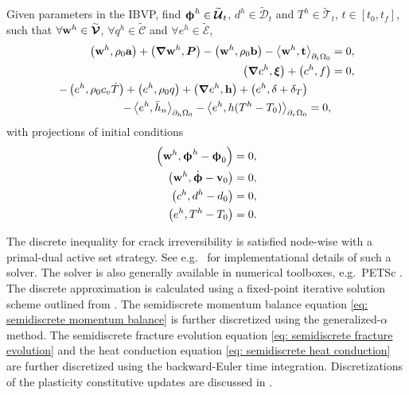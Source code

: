 \begin{mdframed}[
    frametitle={The semidiscrete Galerkin form},
    frametitlebackgroundcolor=gray!20,
    backgroundcolor=gray!5,
    linewidth=0pt,
    nobreak=true
  ]
  Given parameters in the IBVP, find $\boldsymbol{\upphi}^h \in \widetilde{\boldsymbol{\mathcal{U}}}_t$, $d^h \in \widetilde{\mathcal{D}}_t$ and $T^h \in \widetilde{\mathcal{T}}_t$, $t \in [t_0, t_f]$, such that $\forall \textbf{w}^h \in \widetilde{\boldsymbol{\mathcal{V}}}$, $\forall q^h \in \widetilde{\mathcal{C}}$ and $\forall e^h \in \widetilde{\mathcal{E}}$,
  \begin{subequations}
    \begin{align}
      \left( \textbf{w}^h, \rho_0\textbf{a} \right) + \left( \boldsymbol{\nabla} \textbf{w}^h, \boldsymbol{P} \right) - \left( \textbf{w}^h, \rho_0 \textbf{b} \right) - \left< \textbf{w}^h, \textbf{t} \right>_{\partial_t\Omega_0} &= 0, \label{eq: semidiscrete momentum balance}    \\
      \left( \boldsymbol{\nabla} c^h, \boldsymbol{\xi} \right) + \left( c^h, f \right) &= 0, \label{eq: semidiscrete fracture evolution} \\
      \begin{split}
        - \left( e^h, \rho_0c_v\dot{T} \right) + \left( e^h, \rho_0q \right) + \left( \boldsymbol{\nabla} e^h, \textbf{h} \right) + \left( e^h, \delta+\delta_T \right)& \\
        - \left< e^h, \bar{h}_n \right>_{\partial_h\Omega_0} - \left< e^h, h(T^h-T_0) \right>_{\partial_r\Omega_0} &= 0,
      \end{split} \label{eq: semidiscrete heat conduction}
    \end{align}
  \end{subequations}
  with projections of initial conditions
  \begin{subequations}
  \begin{align}
      \left( \textbf{w}^h, \boldsymbol{\upphi}^h - \boldsymbol{\upphi}_0 \right) &= 0, \\
      \left( \textbf{w}^h, \dot{\boldsymbol{\upphi}} - \textbf{v}_0 \right) &= 0, \\
      \left( c^h, d^h - d_0 \right) &= 0, \\
      \left( e^h, T^h - T_0 \right) &= 0.
  \end{align}
  \end{subequations}
\end{mdframed}
The discrete inequality for crack irreversibility is satisfied node-wise with a primal-dual active set strategy. See e.g.\  \citet{heister2015primal} for implementational details of such a solver. The solver is also generally available in numerical toolboxes, e.g.\  PETSc \cite{petsc-web-page}. The discrete approximation is calculated using a fixed-point iterative solution scheme outlined from \cite{HuGary2020}. The semidiscrete momentum balance equation \eqref{eq: semidiscrete momentum balance} is further discretized using the generalized-$\alpha$ method. The semidiscrete fracture evolution equation \eqref{eq: semidiscrete fracture evolution} and the heat conduction equation \eqref{eq: semidiscrete heat conduction} are further discretized using the backward-Euler time integration. Discretizations of the plasticity constitutive updates are discussed in .
